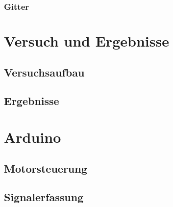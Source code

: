 \documentclass{article}
\begin{document}
\subsubsection{Gitter}


\section{Versuch und Ergebnisse}


\subsection{Versuchsaufbau}


\subsection{Ergebnisse}


\section{Arduino} %

\subsection{Motorsteuerung}

\subsection{Signalerfassung}
\end{document}
